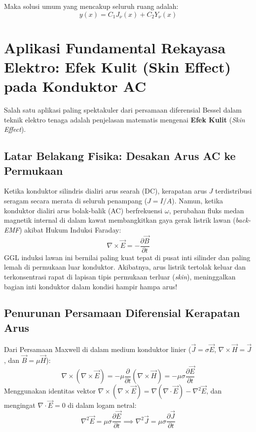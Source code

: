 \documentclass[11pt,a4paper]{article}
\theoremstyle{definition}
\begin{document}
Maka solusi umum yang mencakup seluruh ruang adalah:
\begin{equation}
    y(x) = C_1 J_\nu(x) + C_2 Y_\nu(x)
\end{equation}

\section{Aplikasi Fundamental Rekayasa Elektro: Efek Kulit (Skin Effect) pada Konduktor AC}

Salah satu aplikasi paling spektakuler dari persamaan diferensial Bessel dalam teknik elektro tenaga adalah penjelasan matematis mengenai \textbf{Efek Kulit} (\textit{Skin Effect}).

\subsection{Latar Belakang Fisika: Desakan Arus AC ke Permukaan}
Ketika konduktor silindris dialiri arus searah (DC), kerapatan arus $J$ terdistribusi seragam secara merata di seluruh penampang ($J = I/A$). Namun, ketika konduktor dialiri arus bolak-balik (AC) berfrekuensi $\omega$, perubahan fluks medan magnetik internal di dalam kawat membangkitkan gaya gerak listrik lawan (\textit{back-EMF}) akibat Hukum Induksi Faraday:
\begin{equation}
    \nabla \times \vec{E} = -\frac{\partial \vec{B}}{\partial t}
\end{equation}
GGL induksi lawan ini bernilai paling kuat tepat di pusat inti silinder dan paling lemah di permukaan luar konduktor. Akibatnya, arus listrik tertolak keluar dan terkonsentrasi rapat di lapisan tipis permukaan terluar (\textit{skin}), meninggalkan bagian inti konduktor dalam kondisi hampir hampa arus!

\subsection{Penurunan Persamaan Diferensial Kerapatan Arus}
Dari Persamaan Maxwell di dalam medium konduktor linier ($\vec{J} = \sigma \vec{E}$, $\nabla \times \vec{H} = \vec{J}$, dan $\vec{B} = \mu \vec{H}$):
\begin{equation}
    \nabla \times (\nabla \times \vec{E}) = -\mu \frac{\partial}{\partial t} (\nabla \times \vec{H}) = -\mu \sigma \frac{\partial \vec{E}}{\partial t}
\end{equation}
Menggunakan identitas vektor $\nabla \times (\nabla \times \vec{E}) = \nabla(\nabla \cdot \vec{E}) - \nabla^2 \vec{E}$, dan mengingat $\nabla \cdot \vec{E} = 0$ di dalam logam netral:
\begin{equation}
    \nabla^2 \vec{E} = \mu \sigma \frac{\partial \vec{E}}{\partial t} \implies \nabla^2 \vec{J} = \mu \sigma \frac{\partial \vec{J}}{\partial t}
    \label{eq:diffusion_current_vector}
\end{equation}
\end{document}
